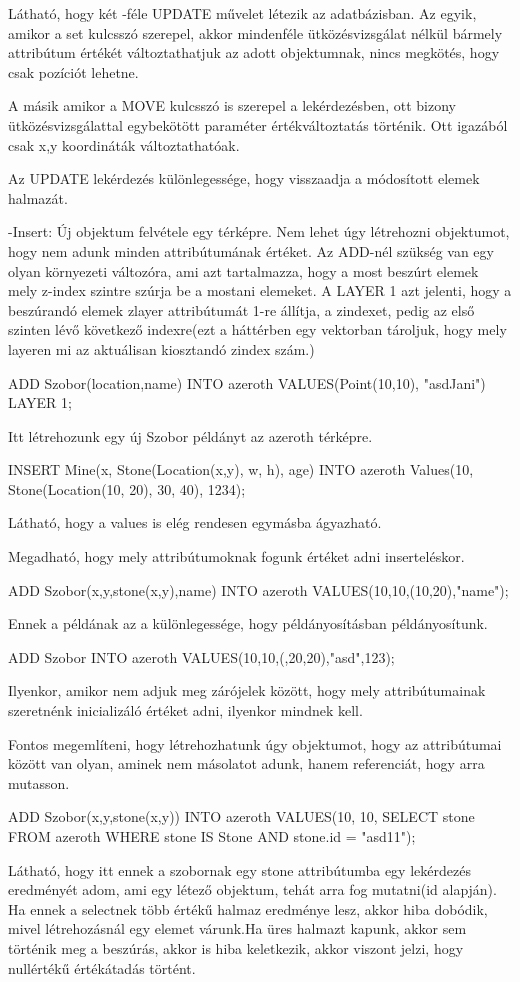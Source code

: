\begin{sql}
Látható, hogy két -féle UPDATE művelet létezik az adatbázisban. Az egyik, amikor a set kulcsszó szerepel, akkor mindenféle ütközésvizsgálat nélkül bármely attribútum értékét változtathatjuk az adott objektumnak, nincs megkötés, hogy csak pozíciót lehetne.

A másik amikor a MOVE kulcsszó is szerepel a lekérdezésben, ott bizony ütközésvizsgálattal egybekötött paraméter értékváltoztatás történik. Ott igazából  csak x,y koordináták változtathatóak.

Az UPDATE lekérdezés különlegessége, hogy visszaadja a módosított elemek halmazát.

-Insert: Új objektum felvétele egy térképre. 
Nem lehet úgy létrehozni objektumot, hogy nem adunk minden attribútumának értéket.
Az ADD-nél szükség van egy olyan környezeti változóra, ami azt tartalmazza, hogy a most beszúrt elemek mely z-index szintre szúrja be a mostani elemeket.
A LAYER 1 azt jelenti, hogy a beszúrandó elemek zlayer attribútumát 1-re állítja, a zindexet, pedig az első szinten lévő következő indexre(ezt a háttérben egy vektorban tároljuk, hogy mely layeren mi az aktuálisan kiosztandó zindex szám.)
\begin{sql}
ADD Szobor(location,name) INTO azeroth VALUES(Point(10,10), "asdJani") LAYER 1;
\end{sql}
Itt létrehozunk egy új Szobor példányt az azeroth térképre.

\begin{sql}
INSERT Mine(x, Stone(Location(x,y), w, h), age) INTO azeroth Values(10, Stone(Location(10, 20), 30, 40), 1234);
\end{sql}
Látható, hogy a values is elég rendesen egymásba ágyazható.

Megadható, hogy mely attribútumoknak fogunk értéket adni inserteléskor.
\begin{sql}
ADD Szobor(x,y,stone(x,y),name) INTO azeroth VALUES(10,10,(10,20),"name");
\end{sql}
Ennek a példának az a különlegessége, hogy példányosításban példányosítunk.

\begin{sql}
ADD Szobor INTO azeroth VALUES(10,10,(,20,20),"asd",123);
\end{sql}
Ilyenkor, amikor nem adjuk meg zárójelek között, hogy mely attribútumainak szeretnénk inicializáló értéket adni, ilyenkor mindnek kell.

Fontos megemlíteni, hogy létrehozhatunk úgy objektumot, hogy az attribútumai között van olyan, aminek nem másolatot adunk, hanem referenciát, hogy arra mutasson.
\begin{sql}
ADD Szobor(x,y,stone(x,y)) INTO azeroth VALUES(10, 10, SELECT stone FROM azeroth WHERE stone IS Stone AND stone.id = "asd11");
\end{sql}
Látható, hogy itt ennek a szobornak egy stone attribútumba egy lekérdezés eredményét adom, ami egy létező objektum, tehát arra fog mutatni(id alapján).
Ha ennek a selectnek több értékű halmaz eredménye lesz, akkor hiba dobódik, mivel létrehozásnál egy elemet várunk.Ha üres halmazt kapunk, akkor sem történik meg a beszúrás, akkor is hiba keletkezik, akkor viszont jelzi, hogy nullértékű értékátadás történt.


\end{sql}
